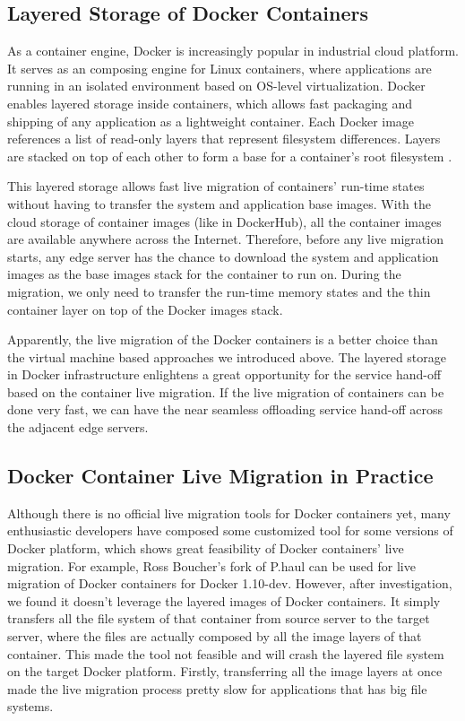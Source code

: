 \subsection{Layered Storage of Docker Containers}

As a container engine, Docker is increasingly popular in industrial cloud platform. It serves as an composing engine for Linux containers, where applications are running in an isolated environment based on OS-level virtualization. Docker enables layered storage inside containers, which allows fast packaging and shipping of any application as a lightweight container. Each Docker image references a list of read-only layers that represent filesystem differences. Layers are stacked on top of each other to form a base for a container’s root filesystem \cite{dockerlayer}. 

This layered storage allows fast live migration of containers' run-time states without having to transfer the system and application base images. With the cloud storage of container images (like in DockerHub), all the container images are available anywhere across the Internet. Therefore, before any live migration starts, any edge server has the chance to download the system and application images as the base images stack for the container to run on. 
During the migration, we only need to transfer the run-time memory states and the thin container layer on top of the Docker images stack. 


Apparently, the live migration of the Docker containers is a better choice than the virtual machine based approaches we introduced above. The layered storage in Docker infrastructure enlightens a great opportunity for the service hand-off based on the container live migration. If the live migration of containers can be done very fast, we can have the near seamless offloading service hand-off across the adjacent edge servers.




\subsection{Docker Container Live Migration in Practice }

Although there is no official live migration tools for Docker containers yet, many enthusiastic developers have composed some customized tool for some versions of Docker platform, which shows great feasibility of Docker containers' live migration. For example, Ross Boucher's fork \cite{boucherPhaul} of P.haul
can be used for live migration of Docker containers for Docker 1.10-dev. However, after investigation, we found it doesn't leverage the layered images of Docker containers. It simply transfers all the file system of that container from source server to the target server, where the files are actually composed by all the image layers of that container. This made the tool not feasible and will crash the layered file system on the target Docker platform. Firstly, transferring all the image layers at once made the live migration process pretty slow for applications that has big file systems. 

